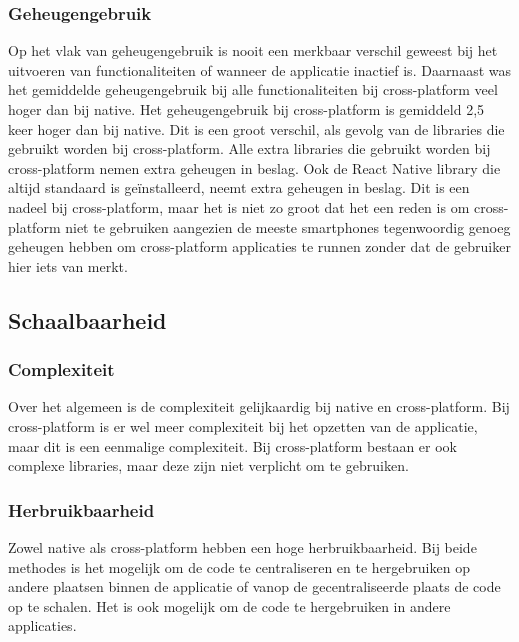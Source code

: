 \subsubsection{Geheugengebruik}
Op het vlak van geheugengebruik is nooit een merkbaar verschil geweest bij het uitvoeren van functionaliteiten 
of wanneer de applicatie inactief is. Daarnaast was het gemiddelde geheugengebruik bij alle functionaliteiten 
bij cross-platform veel hoger dan bij native. Het geheugengebruik bij cross-platform is gemiddeld 2,5 keer hoger
dan bij native. Dit is een groot verschil, als gevolg van de libraries die gebruikt worden bij cross-platform.
Alle extra libraries die gebruikt worden bij cross-platform nemen extra geheugen in beslag. Ook de React 
Native library die altijd standaard is geïnstalleerd, neemt extra geheugen in beslag. Dit is een nadeel bij
cross-platform, maar het is niet zo groot dat het een reden is om cross-platform niet te gebruiken aangezien 
de meeste smartphones tegenwoordig genoeg geheugen hebben om cross-platform applicaties te runnen zonder dat
de gebruiker hier iets van merkt.

\subsection{Schaalbaarheid}
\subsubsection{Complexiteit}
Over het algemeen is de complexiteit gelijkaardig bij native en cross-platform. Bij cross-platform is er wel
meer complexiteit bij het opzetten van de applicatie, maar dit is een eenmalige complexiteit. 
Bij cross-platform bestaan er ook complexe libraries, maar deze zijn niet verplicht om te gebruiken.

\subsubsection{Herbruikbaarheid}
Zowel native als cross-platform hebben een hoge herbruikbaarheid. Bij beide methodes is het mogelijk
om de code te centraliseren en te hergebruiken op andere plaatsen binnen de applicatie of vanop de 
gecentraliseerde plaats de code op te schalen. Het is ook mogelijk om de code te hergebruiken in 
andere applicaties.

